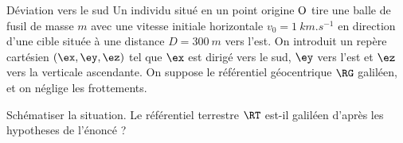 \begin{exo}[PC][2][TD]{Déviation vers le sud}
Un individu situé en un point origine $\rm O$ tire une balle de fusil de masse $m$ avec une vitesse initiale horizontale $v_0=\SI{1}{km.s^{-1}}$ en direction d'une cible située à une distance $D=\SI{300}{m}$ vers l'est.
On introduit un repère cartésien $(\ex,\ey,\ez)$ tel que $\ex$ est dirigé vers le sud, $\ey$ vers l'est et $\ez$ vers la verticale ascendante. On suppose le référentiel géocentrique $\RG$ galiléen, et on néglige les frottements. 

\begin{quest}
\item Schématiser la situation. Le référentiel terrestre $\RT$ est-il galiléen d’après les hypotheses de l’énoncé ?
\end{quest}
\end{exo}
